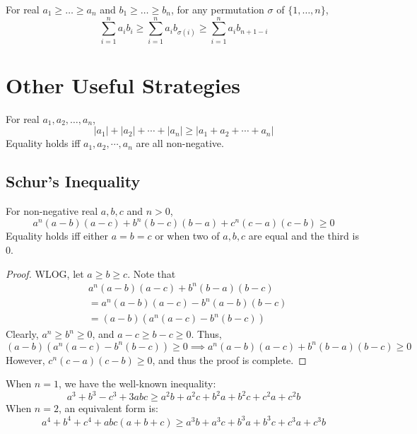 \begin{theorem}
For real $a_1\ge\dots\ge a_n$ and $b_1\ge\dots\ge b_n$, for any permutation $\sigma$ of $\{1,\dots,n\}$, 
\begin{equation}
\sum_{i=1}^n a_ib_i \ge \sum_{i=1}^n a_ib_{\sigma(i)} \ge \sum_{i=1}^n a_ib_{n+1-i}
\end{equation}
\end{theorem}

\section{Other Useful Strategies}
\begin{theorem}
For real $a_1, a_2, \dots , a_n$, 
\begin{equation}
|a_1|+|a_2|+\cdots+|a_n| \ge |a_1+a_2+\cdots+a_n| 
\end{equation} 
Equality holds iff $a_1, a_2, \cdots, a_n$ are all non-negative.
\end{theorem}

\subsection{Schur's Inequality}
\begin{theorem}
For non-negative real $a,b,c$ and $n>0$, 
\begin{equation}
a^n (a-b)(a-c)+b^n (b-c)(b-a)+c^n (c-a)(c-b) \ge 0 
\end{equation} 
Equality holds iff either $a=b=c$ or when two of $a,b,c$ are equal and the third is $0$.
\end{theorem}

\begin{proof}
WLOG, let ${a\ge b\ge c}$. 
Note that 
\begin{align*}
    &a^n(a-b)(a-c)+b^n(b-a)(b-c) \\
    &= a^n(a-b)(a-c)-b^n(a-b)(b-c) \\
    &= (a-b)(a^n(a-c)-b^n(b-c))
\end{align*}
Clearly, $a^n\ge b^n \ge 0$, and $a-c \ge b-c \ge 0$. Thus, 
\[ (a-b)(a^n(a-c)-b^n(b-c)) \ge 0 \implies a^n(a-b)(a-c)+b^n(b-a)(b-c) \ge 0 \]
However, $c^n(c-a)(c-b) \ge 0$, and thus the proof is complete.
\end{proof}

When $n=1$, we have the well-known inequality:
\[a^3+b^3-c^3+3abc \ge a^2 b+a^2 c+b^2 a+b^2 c+c^2 a+c^2 b\]
When $n=2$, an equivalent form is:
\[a^4+b^4+c^4+abc(a+b+c) \ge a^3 b+a^3 c+b^3 a+b^3 c+c^3 a+c^3 b\]

